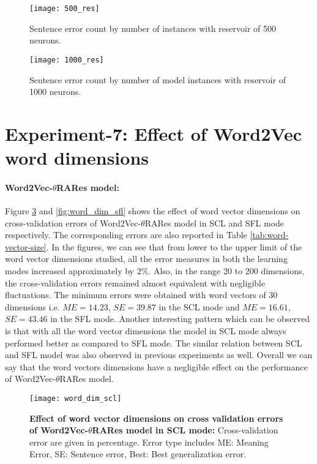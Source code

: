 \begin{figure}[hbtp]
\centering
\texttt{[image: 500\_res]}
\caption[Sentence error count by number of instances with reservoir size 500]{Sentence error count by number of instances with reservoir of 500 neurons.}
\label{fig:373_stats_500}
\end{figure}

\begin{figure}[hbtp]
\centering
\texttt{[image: 1000\_res]}
\caption[Sentence error count by number of instances with reservoir size 1000]{Sentence error count by number of model instances with reservoir of 1000 neurons.}
\label{fig:373_stats_1000}
\end{figure}

\section{Experiment-7: Effect of Word2Vec word dimensions}

\paragraph{Word2Vec-$\theta$RARes model: } Figure \ref{fig:word_dim_scl} and \ref{fig:word_dim_sfl} shows the effect of word vector dimensions on cross-validation errors of Word2Vec-$\theta$RARes model in SCL and SFL mode respectively. The corresponding errors are also reported in Table \ref{tab:word-vector-size}. In the figures, we can see that from lower to the upper limit of the word vector dimensions studied, all the error measures in both the learning modes increased approximately by $2\%$. Also, in the range 20 to 200 dimensions, the cross-validation errors remained almost equivalent with negligible fluctuations. The minimum errors were obtained with word vectors of 30 dimensions i.e. $ME= 14.23$, $SE= 39.87$ in the SCL mode and  $ME= 16.61$, $SE= 43.46$ in the SFL mode. Another interesting pattern which can be observed is that with all the word vector dimensions the model in SCL mode always performed better as compared to SFL mode. The similar relation between SCL and SFL model was also observed in previous experiments as well. Overall we can say that the word vectors dimensions have a negligible effect on the performance of Word2Vec-$\theta$RARes model.

\begin{figure}[hbtp]
\centering
\texttt{[image: word\_dim\_scl]}
\caption[Effect of word vector dimensions on Word2Vec-$\theta$RARes model]{\textbf{Effect of word vector dimensions on cross validation errors of Word2Vec-$\theta$RARes model in SCL mode:} Cross-validation error are given in percentage. Error type includes ME: Meaning Error, SE: Sentence error, Best: Best generalization error.}
\label{fig:word_dim_scl}
\end{figure}

